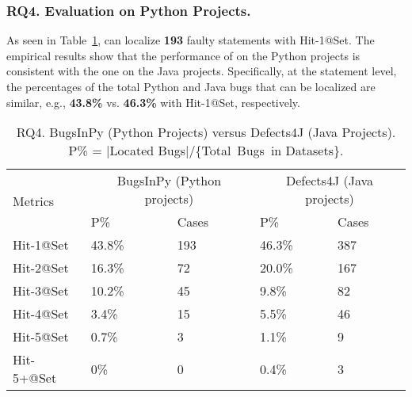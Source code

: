\subsubsection{\bf RQ4. Evaluation on Python Projects.}
As seen in Table~\ref{RQ4}, {\tool} can localize {\bf 193} faulty
statements with Hit-1@Set. The empirical results show that the
performance of {\tool} on the Python projects is consistent with the
one on the Java projects. Specifically, at the statement level, the
percentages of the total Python and Java bugs that can be localized
are similar, e.g., {\bf 43.8\%} vs. {\bf 46.3\%} with Hit-1@Set,
respectively.



\begin{table}[t]
	\caption{RQ4. BugsInPy (Python Projects) versus Defects4J (Java Projects). P\% = $|$Located Bugs$|$/\{Total~Bugs~in Datasets\}.}
	\vspace{-5pt}
	{\footnotesize
		\begin{center}
			\tabcolsep 2.7pt
			\begin{tabular}{p{1.4cm}<{\centering}|p{1.55cm}<{\centering}p{1.55cm}<{\centering}|p{1.55cm}<{\centering}p{1.55cm}<{\centering}}\hline\cline{2-5}	
				
		\multirow{2}{*}{Metrics}& \multicolumn{2}{c|}{BugsInPy (Python projects)} & \multicolumn{2}{c}{Defects4J (Java projects)}\\\cline{2-5}
				           & P\%& Cases &P\%& Cases \\ \hline
				
				Hit-1@Set  &  43.8\%  &   193    & 46.3\%  &387\\ 
				\hline
				  
			    Hit-2@Set  &  16.3\%  &   72   & 20.0\%  &167\\
				\hline
				
				 
				Hit-3@Set  &  10.2\%  &  45     & 9.8\%  &82\\
				\hline
				
				Hit-4@Set  &  3.4\%  &   15    & 5.5\%  &46\\
				\hline
				
				Hit-5@Set  & 0.7\%   &   3    & 1.1\%  &9\\
				\hline
				
				Hit-5+@Set &  0\%  &   0    & 0.4\%  &3\\
				\hline
			\end{tabular}
			\label{RQ4}
		\end{center}
	}
\end{table}



